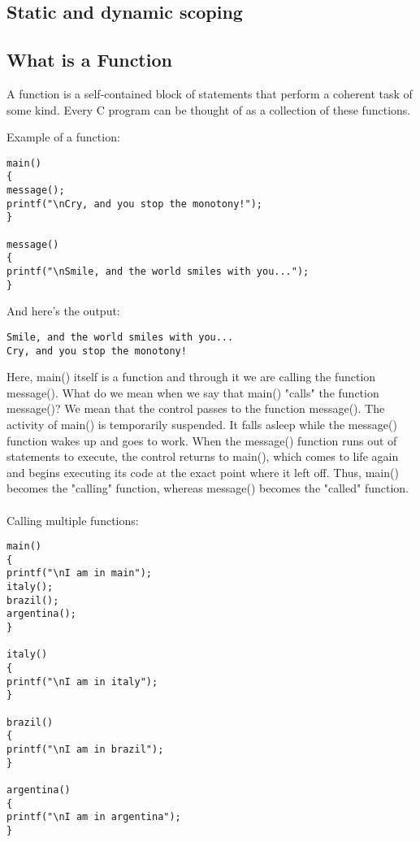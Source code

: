 \subsection{Static and dynamic scoping}


\iffalse
\subsection{What is a Function}
A function is a self-contained block of statements that perform a coherent task of some kind. Every C program can be thought of as a collection of these functions.

Example of a function:
\begin{lstlisting}[style=CStyle]
main()
{
message();
printf("\nCry, and you stop the monotony!");
}

message()
{
printf("\nSmile, and the world smiles with you...");
}
\end{lstlisting}
And here’s the output: 

\begin{lstlisting}[style=CStyle]
Smile, and the world smiles with you...
Cry, and you stop the monotony!
\end{lstlisting}

Here, main() itself is a function and through it we are calling the function message(). What do we mean when we say that main() "calls" the function message()? We mean that the control passes to the function message(). The activity of main() is temporarily suspended. It falls asleep while the message() function wakes up and goes to work. When the message() function runs out of statements to execute, the control returns to main(), which comes to life again and begins executing its code at the exact point where it left off. Thus, main() becomes the "calling" function, whereas message() becomes the "called" function.

\paragraph{} Calling multiple functions:
\begin{lstlisting}[style=CStyle]
main()
{
printf("\nI am in main");
italy();
brazil();
argentina();
}

italy()
{
printf("\nI am in italy");
}

brazil()
{
printf("\nI am in brazil");
}

argentina()
{
printf("\nI am in argentina");
}
\end{lstlisting}

